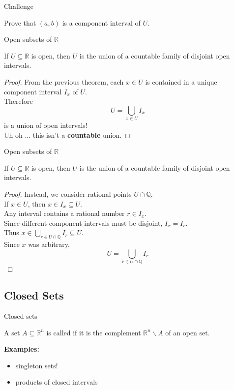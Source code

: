 \documentclass{beamer}
\begin{document}
\begin{frame}{Challenge}
\begin{prob}
Prove that $(a,b)$ is a component interval of $U$.
\end{prob}
\end{frame}

\begin{frame}{Open subsets of $\mathbb{R}$}
\begin{thm}
If $U\subseteq\mathbb{R}$ is open, then $U$ is the union of a countable family of disjoint open intervals.
\end{thm}
\pause
\begin{proof}
From the previous theorem, each $x\in U$ is contained in a unique component interval $I_x$ of $U$.\\
\pause
Therefore
$$U = \bigcup_{x\in U} I_x$$
is a union of open intervals!\\
\pause
{\color{red}Uh oh ... this isn't a \textbf{countable} union.}
\end{proof}
\end{frame}

\begin{frame}{Open subsets of $\mathbb{R}$}
\begin{thm}
If $U\subseteq\mathbb{R}$ is open, then $U$ is the union of a countable family of disjoint open intervals.
\end{thm}
\begin{proof}
Instead, we consider rational points $U\cap\mathbb{Q}$.\\
\pause
If $x\in U$, then $x\in I_x\subseteq U$.\\
\pause
Any interval contains a rational number $r\in I_x$.\\
\pause
Since different component intervals must be disjoint, $I_x=I_r$.\\
\pause
Thus $x\in \bigcup_{r\in U\cap\mathbb{Q}} I_r\subseteq U$.\\
\pause
Since $x$ was arbitrary, 
$$U= \bigcup_{r\in U\cap\mathbb{Q}} I_r$$
\end{proof}
\end{frame}

\subsection{Closed Sets}

\begin{frame}{Closed sets}
\begin{defn}
A set $A\subseteq\mathbb{R}^n$ is called  if it is the complement $\mathbb{R}^n\backslash A$ of an open set.
\end{defn}
\pause
\textbf{Examples:}
\begin{itemize}
\pause
\item singleton sets!
\pause
\item products of closed intervals
\end{itemize}
\end{frame}
\end{document}
